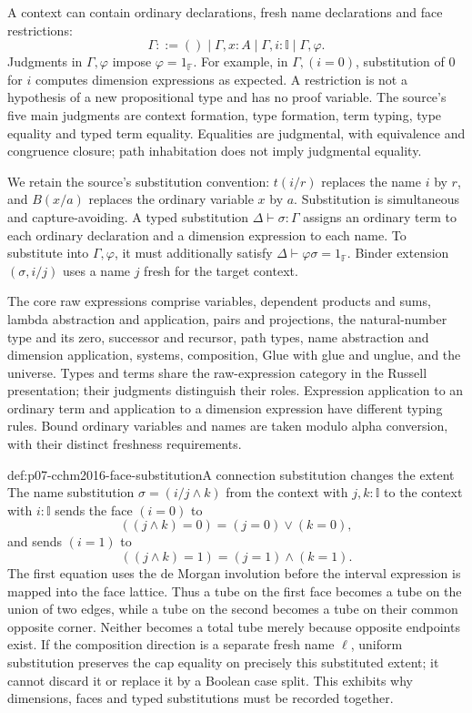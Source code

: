 A context can contain ordinary declarations, fresh name declarations
and face restrictions:
\[
 \Gamma ::=()\mid\Gamma,x:A\mid\Gamma,i:\mathbb I\mid\Gamma,\varphi .
\]
Judgments in \(\Gamma,\varphi\) impose \(\varphi=1_{\mathbb F}\).
For example, in \(\Gamma,(i=0)\), substitution of \(0\) for \(i\)
computes dimension expressions as expected.  A restriction is not a
hypothesis of a new propositional type and has no proof variable.
The source's five main judgments are context formation, type formation,
term typing, type equality and typed term equality.  Equalities are
judgmental, with equivalence and congruence closure; path inhabitation
does not imply judgmental equality.

We retain the source's substitution convention: \(t(i/r)\) replaces
the name \(i\) by \(r\), and \(B(x/a)\) replaces the ordinary variable
\(x\) by \(a\).  Substitution is simultaneous and capture-avoiding.
A typed substitution \(\Delta\vdash\sigma:\Gamma\) assigns an ordinary
term to each ordinary declaration and a dimension expression to each
name.  To substitute into \(\Gamma,\varphi\), it must additionally
satisfy \(\Delta\vdash\varphi\sigma=1_{\mathbb F}\).  Binder extension
\((\sigma,i/j)\) uses a name \(j\) fresh for the target context.

The core raw expressions comprise variables, dependent products and
sums, lambda abstraction and application, pairs and projections, the
natural-number type and its zero, successor and recursor, path types,
name abstraction and dimension application, systems, composition,
Glue with glue and unglue, and the universe.  Types and terms share
the raw-expression category in the Russell presentation; their
judgments distinguish their roles.  Expression application to an
ordinary term and application to a dimension expression have different
typing rules.  Bound ordinary variables and names are taken modulo
alpha conversion, with their distinct freshness requirements.

\begin{hbexample}{def:p07-cchm2016-face-substitution}{A connection substitution changes the extent}
The name substitution \(\sigma=(i/j\wedge k)\) from the context with
\(j,k:\mathbb I\) to the context with \(i:\mathbb I\) sends the face
\((i=0)\) to
\[
 ((j\wedge k)=0)=(j=0)\vee(k=0),
\]
and sends \((i=1)\) to
\[
 ((j\wedge k)=1)=(j=1)\wedge(k=1).
\]
The first equation uses the de Morgan involution before the interval
expression is mapped into the face lattice.  Thus a tube on the first
face becomes a tube on the union of two edges, while a tube on the
second becomes a tube on their common opposite corner.  Neither
becomes a total tube merely because opposite endpoints exist.
If the composition direction is a separate fresh name \(\ell\),
uniform substitution preserves the cap equality on precisely this
substituted extent; it cannot discard it or replace it by a Boolean
case split.  This exhibits why dimensions, faces and typed
substitutions must be recorded together.
\end{hbexample}

